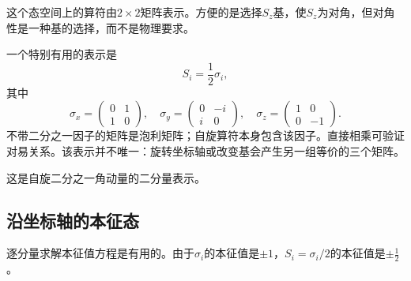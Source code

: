 这个态空间上的算符由\(2\times2\)矩阵表示。方便的是选择\(S_z\)基，使\(S_z\)为对角，但对角性是一种基的选择，而不是物理要求。

\begin{classroomqa}
\end{classroomqa}

\begin{classroomqa}
\end{classroomqa}

一个特别有用的表示是
\begin{equation}
S_i=\frac12\sigma_i,
\end{equation}
其中
\begin{equation}
\sigma_x=
\begin{pmatrix}
0&1\\
1&0
\end{pmatrix},
\quad
\sigma_y=
\begin{pmatrix}
0&-i\\
i&0
\end{pmatrix},
\quad
\sigma_z=
\begin{pmatrix}
1&0\\
0&-1
\end{pmatrix}.
\end{equation}
不带二分之一因子的矩阵是泡利矩阵；自旋算符本身包含该因子。直接相乘可验证对易关系。该表示并不唯一：旋转坐标轴或改变基会产生另一组等价的三个矩阵。

这是自旋二分之一角动量的二分量表示。

\subsection{沿坐标轴的本征态}

逐分量求解本征值方程是有用的。由于\(\sigma_i\)的本征值是\(\pm1\)，\(S_i=\sigma_i/2\)的本征值是\(\pm\tfrac12\)。

